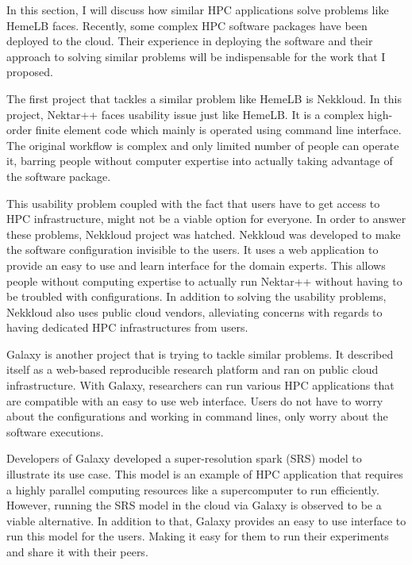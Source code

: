 In this section, I will discuss how similar HPC applications solve problems like HemeLB faces. Recently, some complex HPC software packages have been deployed to the cloud. Their experience in deploying the software and their approach to solving similar problems will be indispensable for the work that I proposed.

The first project that tackles a similar problem like HemeLB is Nekkloud. In this project, Nektar++ faces usability issue just like HemeLB. It is a complex high-order finite element code which mainly is operated using command line interface. The original workflow is complex and only limited number of people can operate it, barring people without computer expertise into actually taking advantage of the software package.

This usability problem coupled with the fact that users have to get access to HPC infrastructure, might not be a viable option for everyone. In order to answer these problems, Nekkloud project was hatched. Nekkloud was developed to make the software configuration invisible to the users. It uses a web application to provide an easy to use and learn interface for the domain experts. This allows people without computing expertise to actually run Nektar++ without having to be troubled with configurations. In addition to solving the usability problems, Nekkloud also uses public cloud vendors, alleviating concerns with regards to having dedicated HPC infrastructures from users. 

Galaxy \citep{goecks2010galaxy} is another project that is trying to tackle similar problems. It described itself as a web-based reproducible research platform and ran on public cloud infrastructure. With Galaxy, researchers can run various HPC applications that are compatible with an easy to use web interface. Users do not have to worry about the configurations and working in command lines, only worry about the software executions.

Developers of Galaxy developed a super-resolution spark (SRS) model to illustrate its use case. This model is an example of HPC application that requires a highly parallel computing resources like a supercomputer to run efficiently. However, running the SRS model in the cloud via Galaxy is observed to be a viable alternative. In addition to that, Galaxy provides an easy to use interface to run this model for the users. Making it easy for them to run their experiments and share it with their peers.

